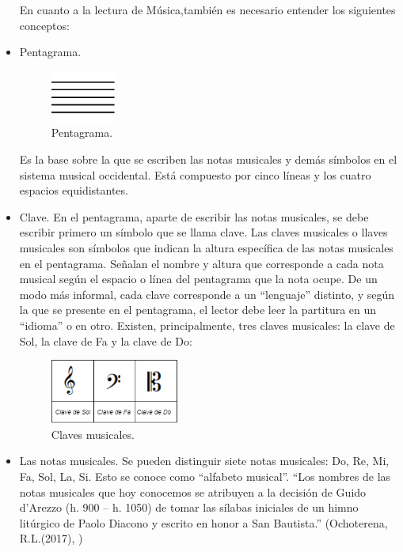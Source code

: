 \documentclass[a4paper, openright, 11pt, titlepage]{report}
\theoremstyle{definition}\newtheorem{defin}[propo]{Definition}
\theoremstyle{definition}\newtheorem{obser}[propo]{Remark}
\theoremstyle{definition}\newtheorem{ejem}[propo]{Ejemplo}
\theoremstyle{definition}\newtheorem{algoritmo}[propo]{Algoritmo}
\begin{document}
\begin{itemize}
    En cuanto a la lectura de Música,también es necesario entender los siguientes conceptos:
    \item Pentagrama. 
   \begin{figure}[H]
        \begin{center}
            \includegraphics[width=0.2\textwidth]{Images/Apéndices/Apéndice A/penta.png}
        \end{center}
        \caption{Pentagrama.}
    \end{figure}
    Es la base sobre la que se escriben las notas musicales y demás símbolos en el sistema musical occidental. Está compuesto por cinco líneas y los cuatro espacios equidistantes.
    \item Clave. En el pentagrama, aparte de escribir las notas musicales, se debe escribir primero un símbolo que se llama clave.
    Las claves musicales o llaves musicales son símbolos que indican la altura específica de las notas musicales en el pentagrama. Señalan el nombre y altura que corresponde a cada nota musical según el espacio o línea del pentagrama que la nota ocupe. De un modo más informal, cada clave corresponde a un ``lenguaje'' distinto, y según la que se presente en el pentagrama, el lector debe leer la partitura en un ``idioma'' o en otro. Existen, principalmente, tres claves musicales: la clave de Sol, la clave de Fa y la clave de Do:
    \begin{figure}[H]
        \centering
        \includegraphics[width = 0.4\textwidth]{Images/Apéndices/Apéndice A/claves1.png}
        \caption{Claves musicales.}
    \end{figure}
    \item Las notas musicales. Se pueden distinguir siete notas musicales: Do, Re, Mi, Fa, Sol, La, Si. Esto se conoce como ``alfabeto musical''. ``Los nombres de las notas musicales que hoy conocemos se atribuyen a la decisión de Guido d’Arezzo (h. 900 – h. 1050) de tomar las sílabas iniciales de un himno litúrgico de Paolo Diacono y escrito en honor a San Bautista.'' (Ochoterena, R.L.(2017), \cite{alfabeto})

\end{itemize}
\end{document}
